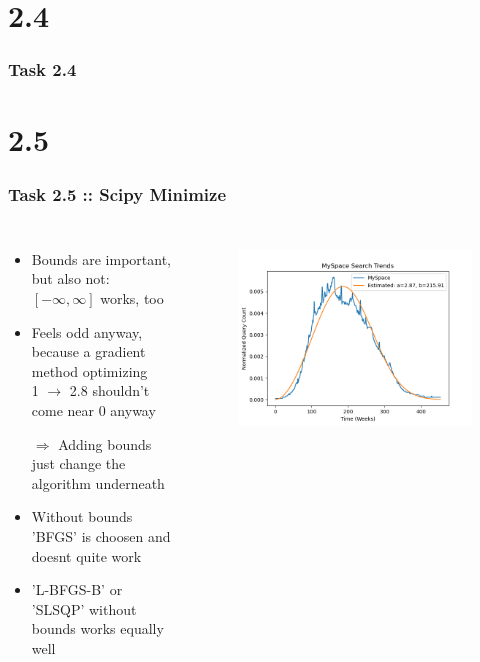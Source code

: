 \documentclass[10pt,aspectratio=169,handout]{beamer}
\begin{document}
\section{2.4}
\begin{frame}
    \frametitle{Task 2.4}
\end{frame}

\section{2.5}
\begin{frame}
    \frametitle{Task 2.5 :: Scipy Minimize}
    \inputminted[bgcolor=LightGray,fontsize=\small]{python}{code/minimize-kl.py}

    \begin{columns}
    \begin{column}{0.7\textwidth}
        \begin{itemize}
            \item Bounds are important, but also not: $[-\infty, \infty]$ works, too
            \item Feels odd anyway, because a gradient method optimizing \\ 
                    1 $\rightarrow$ 2.8 shouldn't come near 0 anyway
            \item[$\Rightarrow$] Adding bounds just change the algorithm underneath
            \item Without bounds 'BFGS' is choosen and doesnt quite work
            \item 'L-BFGS-B' or 'SLSQP' without bounds works equally well
        \end{itemize}
    \end{column}

    \begin{column}{0.3\textwidth}
        \begin{figure}
            \includegraphics[width=\textwidth]{images/sciminimize.png}
        \end{figure}
    \end{column}
    \end{columns}

\end{frame}
\end{document}
